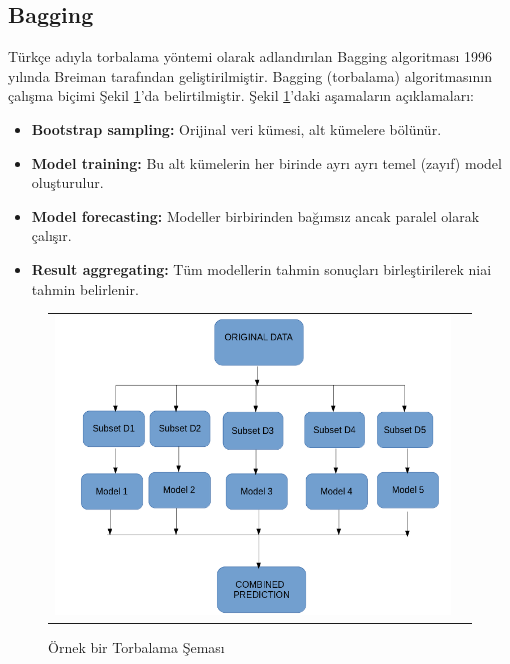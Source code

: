 \documentclass[conference]{IEEEtran}
\begin{document}
\subsection{\textbf{Bagging}}
\quad Türkçe adıyla torbalama yöntemi olarak adlandırılan Bagging algoritması 1996 yılında Breiman tarafından geliştirilmiştir. Bagging (torbalama) algoritmasının çalışma biçimi Şekil \ref{fig:06}'da belirtilmiştir. Şekil \ref{fig:06}'daki aşamaların açıklamaları\cite{18}:

\begin{itemize}
\item \textbf{Bootstrap sampling:} Orijinal veri kümesi, alt kümelere bölünür.
\item \textbf{Model training:} Bu alt kümelerin her birinde ayrı ayrı temel (zayıf) model oluşturulur.
\item \textbf{Model forecasting:} Modeller birbirinden bağımsız ancak paralel olarak çalışır.
\item \textbf{Result aggregating:} Tüm modellerin tahmin sonuçları birleştirilerek niai tahmin belirlenir.
\end{itemize}

\begin{figure}[!h]
	\centering%
	\begin{center}
		\begin{tabular}{cc}%
			\includegraphics[scale=0.35]{pictures/pic_06.png}&%
		\end{tabular}%
	\end{center}
	\caption{Örnek bir Torbalama Şeması\cite{18}}%
	\label{fig:06}
\end{figure}
\newpage
\end{document}

